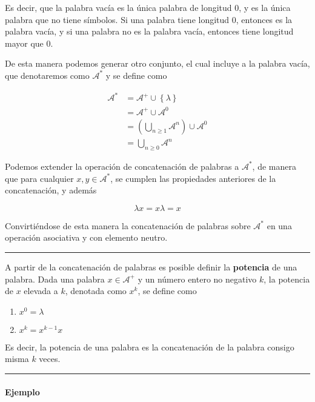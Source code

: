 Es decir, que la palabra vacía es la única palabra de longitud 0, y es
la única palabra que no tiene símbolos. Si una palabra tiene longitud 0,
entonces es la palabra vacía, y si una palabra no es la palabra vacía,
entonces tiene longitud mayor que 0.

De esta manera podemos generar otro conjunto, el cual incluye a la
palabra vacía, que denotaremos como \(\mathcal{A}^*\) y se define como


\begin{align*}
\mathcal{A}^* &= \mathcal{A}^+\cup\left\{\lambda\right\}\\
&= \mathcal{A}^+\cup\mathcal{A}^0\\
&= \left(\bigcup_{n\geq1}\mathcal{A}^n\right)\cup\mathcal{A}^0\\
&= \bigcup_{n\geq0}\mathcal{A}^n
\end{align*}


Podemos extender la operación de concatenación de palabras a
\(\mathcal{A}^*\), de manera que para cualquier \(x,y\in\mathcal{A}^*\),
se cumplen las propiedades anteriores de la concatenación, y además

\[
\lambda x = x\lambda = x
\]

Convirtiéndose de esta manera la concatenación de palabras sobre
\(\mathcal{A}^*\) en una operación asociativa y con elemento neutro.

\begin{center}\rule{0.5\linewidth}{0.5pt}\end{center}

A partir de la concatenación de palabras es posible definir la
\textbf{potencia} de una palabra. Dada una palabra \(x\in\mathcal{A}^+\)
y un número entero no negativo \(k\), la potencia de \(x\) elevada a
\(k\), denotada como \(x^k\), se define como

\begin{enumerate}
\def\labelenumi{\arabic{enumi}.}
\tightlist
\item
  \(x^0=\lambda\)
\item
  \(x^k=x^{k-1}x\)
\end{enumerate}

Es decir, la potencia de una palabra es la concatenación de la palabra
consigo misma \(k\) veces.

\begin{center}\rule{0.5\linewidth}{0.5pt}\end{center}

\paragraph{Ejemplo}\label{ejemplo-2}

